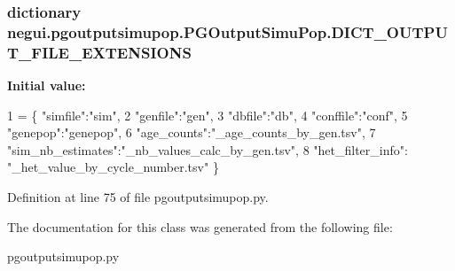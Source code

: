 \subsubsection[{\texorpdfstring{D\+I\+C\+T\+\_\+\+O\+U\+T\+P\+U\+T\+\_\+\+F\+I\+L\+E\+\_\+\+E\+X\+T\+E\+N\+S\+I\+O\+NS}{DICT_OUTPUT_FILE_EXTENSIONS}}]{\setlength{\rightskip}{0pt plus 5cm}dictionary negui.\+pgoutputsimupop.\+P\+G\+Output\+Simu\+Pop.\+D\+I\+C\+T\+\_\+\+O\+U\+T\+P\+U\+T\+\_\+\+F\+I\+L\+E\+\_\+\+E\+X\+T\+E\+N\+S\+I\+O\+NS\hspace{0.3cm}{\ttfamily [static]}}\hypertarget{classnegui_1_1pgoutputsimupop_1_1PGOutputSimuPop_a9c9afd31cd09eedc7187eaf6a48ef74a}{}\label{classnegui_1_1pgoutputsimupop_1_1PGOutputSimuPop_a9c9afd31cd09eedc7187eaf6a48ef74a}
{\bfseries Initial value\+:}
\begin{DoxyCode}
1 = \{ \textcolor{stringliteral}{"simfile"}:\textcolor{stringliteral}{"sim"},
2                                     \textcolor{stringliteral}{"genfile"}:\textcolor{stringliteral}{"gen"},
3                                     \textcolor{stringliteral}{"dbfile"}:\textcolor{stringliteral}{"db"},
4                                     \textcolor{stringliteral}{"conffile"}:\textcolor{stringliteral}{"conf"},
5                                     \textcolor{stringliteral}{"genepop"}:\textcolor{stringliteral}{"genepop"},
6                                     \textcolor{stringliteral}{"age\_counts"}:\textcolor{stringliteral}{"\_age\_counts\_by\_gen.tsv"},
7                                     \textcolor{stringliteral}{"sim\_nb\_estimates"}:\textcolor{stringliteral}{"\_nb\_values\_calc\_by\_gen.tsv"},
8                                     \textcolor{stringliteral}{"het\_filter\_info"}: \textcolor{stringliteral}{"\_het\_value\_by\_cycle\_number.tsv"} \}
\end{DoxyCode}


Definition at line 75 of file pgoutputsimupop.\+py.



The documentation for this class was generated from the following file\+:\begin{DoxyCompactItemize}
\item 
pgoutputsimupop.\+py\end{DoxyCompactItemize}
